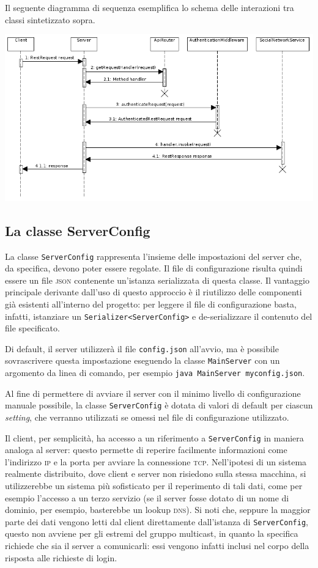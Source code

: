 \documentclass[a4paper,8pt]{article} %
\def\code#1{\texttt{#1}}
\begin{document}
\par Il seguente diagramma di sequenza esemplifica lo schema delle interazioni tra classi sintetizzato sopra.
\par \includegraphics[width=\textwidth]{sequence.png}

\subsection{La classe ServerConfig}
La classe \code{ServerConfig} rappresenta l'insieme delle impostazioni del server che, da specifica, devono poter essere regolate.
Il file di configurazione risulta quindi essere un file \textsc{json} contenente un'istanza serializzata di questa classe. Il vantaggio principale derivante dall'uso di questo approccio è
il riutilizzo delle componenti già esistenti all'interno del progetto: per leggere il file di configurazione basta, infatti, istanziare un \code{Serializer<ServerConfig>} e de-serializzare il contenuto del file
specificato.
\par Di default, il server utilizzerà il file \code{config.json} all'avvio, ma è possibile sovrascrivere questa impostazione eseguendo la classe \code{MainServer} con un argomento da linea di comando, per esempio
\code{java MainServer myconfig.json}.

\par Al fine di permettere di avviare il server con il minimo livello di configurazione manuale possibile, la classe \code{ServerConfig} è dotata di valori di default per ciascun \emph{setting}, che verranno utilizzati
se omessi nel file di configurazione utilizzato.

\par Il client, per semplicità, ha accesso a un riferimento a \code{ServerConfig} in maniera analoga al server: questo permette di reperire facilmente informazioni come l'indirizzo \textsc{ip} e la porta per avviare la connessione \textsc{tcp}.
Nell'ipotesi di un sistema realmente distribuito, dove client e server non risiedono sulla stessa macchina, si utilizzerebbe un sistema più sofisticato per il reperimento di tali dati, come per esempio l'accesso a un terzo servizio (se
il server fosse dotato di un nome di dominio, per esempio, basterebbe un lookup \textsc{dns}). Si noti che, seppure la maggior parte dei dati vengono letti dal client direttamente dall'istanza di \code{ServerConfig}, questo
non avviene per gli estremi del gruppo multicast, in quanto la specifica richiede che sia il server a comunicarli: essi vengono infatti inclusi nel corpo della risposta alle richieste di login.
\end{document}
